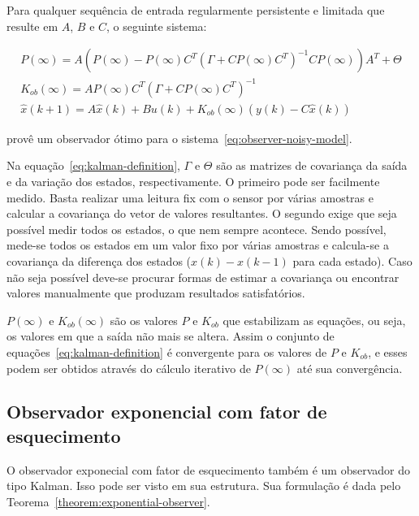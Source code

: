 \begin{theorem}%
	\label{theorem:kalman}
	Para qualquer sequência de entrada regularmente persistente e limitada que
	resulte em \( A \), \( B \) e \( C \), o seguinte sistema:

	\begin{equation}
		\label{eq:kalman-definition}
		\begin{split}
			P(\infty)=A(P(\infty)-P(\infty)C^T{(\Gamma+CP(\infty)C^T)}^{-1}CP(\infty))A^T+\Theta \\
			K_{ob}(\infty)=AP(\infty)C^T{(\Gamma+CP(\infty)C^T)}^{-1} \\
			\hat{x}(k+1) = A\hat{x}(k) + Bu(k) + K_{ob}(\infty)(y(k) - C\hat{x}(k))
		\end{split}
	\end{equation}

	provê um observador  ótimo para o sistema~\eqref{eq:observer-noisy-model}.
\end{theorem}

Na equação~\eqref{eq:kalman-definition}, \( \Gamma \) e \( \Theta \) são as
matrizes de covariança da saída e da variação dos estados, respectivamente. O
primeiro pode ser facilmente medido. Basta realizar uma leitura fix com o sensor
por várias amostras e calcular a covariança do vetor de valores resultantes. O
segundo exige que seja possível medir todos os estados, o que nem sempre
acontece. Sendo possível, mede-se todos os estados em um valor fixo por várias
amostras e calcula-se a covariança da diferença dos estados (\( x(k) - x(k-1) \)
para cada estado). Caso não seja possível deve-se procurar formas de estimar a
covariança ou encontrar valores manualmente que produzam resultados
satisfatórios.

\( P(\infty) \) e \( K_{ob}(\infty) \) são os valores \( P \) e \( K_{ob} \) que
estabilizam as equações, ou seja, os valores em que a saída não mais se altera.
Assim o conjunto de equações~\eqref{eq:kalman-definition} é convergente para os
valores de \( P \) e \( K_{ob} \), e esses podem ser obtidos através do cálculo
iterativo de \( P(\infty) \) até sua convergência.

\subsection{Observador exponencial com fator de esquecimento}%
\label{subsec:exponential-observer}

O observador exponecial com fator de esquecimento\cite{Ticlea2009} também é um
observador do tipo Kalman. Isso pode ser visto em sua estrutura. Sua formulação
é dada pelo Teorema~\ref{theorem:exponential-observer}.

